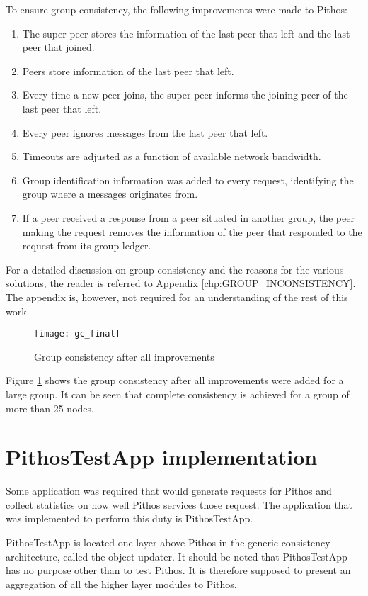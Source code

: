 To ensure group consistency, the following improvements were made to Pithos:
%
\begin{enumerate}
\item The super peer stores the information of the last peer that left and the last peer that joined.
\item Peers store information of the last peer that left.
\item Every time a new peer joins, the super peer informs the joining peer of the last peer that left.
\item Every peer ignores messages from the last peer that left.
\item Timeouts are adjusted as a function of available network bandwidth.
\item Group identification information was added to every request, identifying the group where a messages originates from.
\item If a peer received a response from a peer situated in another group, the peer making the request removes the information of the peer that responded to the request from its group ledger.
\end{enumerate}

For a detailed discussion on group consistency and the reasons for the various solutions, the reader is referred to Appendix \ref{chp:GROUP_INCONSISTENCY}. The appendix is, however, not required for an understanding of the rest of this work.

\begin{figure}[htbp]
 \centering
 \texttt{[image: gc\_final]}
 \caption{Group consistency after all improvements}
 \label{fig_gc_final}
\end{figure}
%
Figure \ref{fig_gc_final} shows the group consistency after all improvements were added for a large group. It can be seen that complete consistency is achieved for a group of more than 25 nodes.

\section{PithosTestApp implementation}
\label{pithostestapp}

Some application was required that would generate requests for Pithos and collect statistics on how well Pithos services those request. The application that was implemented to perform this duty is PithosTestApp.

PithosTestApp is located one layer above Pithos in the generic consistency architecture, called the object updater. It should be noted that PithosTestApp has no purpose other than to test Pithos. It is therefore supposed to present an aggregation of all the higher layer modules to Pithos.

